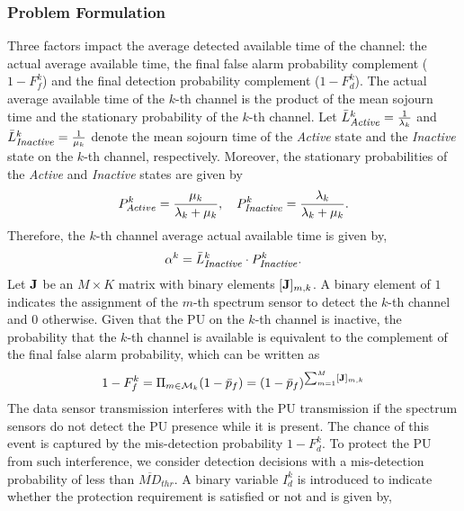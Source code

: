 \documentclass[journal]{IEEEtran} \ifCLASSINFOpdf
\begin{document}
\subsubsection{Problem Formulation}
Three factors impact the average detected available time of the channel: the actual average available time, the final false alarm probability complement ($1 - F_f^k$) and the final detection probability complement ($1 - F_d^k$). The actual average available time of the $k$-th channel is the product of the mean sojourn time and the stationary probability of the $k$-th channel. Let $\bar{L}_{\mbox{\textit{\footnotesize Active}}}^k= \frac{1}{\lambda_k}$ and $\bar{L}_{\mbox{\textit{\footnotesize Inactive}}}^k = \frac{1}{\mu_k}$ denote the mean sojourn time of the \textit{Active} state and the \textit{Inactive} state on the $k$-th channel, respectively. Moreover, the stationary probabilities of the \textit{Active} and \textit{Inactive} states are given by
\begin{equation}\label{eqn_Poo}
P_{Active}^k = \frac{\mu_k}{\lambda_k + \mu_k}, \quad P_{\mbox{\footnotesize \textit{Inactive}}}^k = \frac{\lambda_k}{\lambda_k + \mu_k}.
\end{equation}
Therefore, the $k$-th channel average actual available time is given by,
\begin{equation}
\alpha^k = \bar{L}_{\mbox{\textit{\footnotesize Inactive}}}^k \cdot P_{\mbox{\textit{\footnotesize Inactive}}}^k.
\end{equation}
Let $\bf{J}$ be an $M \times K$ matrix with binary elements $[{\bf J}]_{m,k}$. A binary element of $1$ indicates the assignment of the $m$-th spectrum sensor to detect the $k$-th channel and $0$ otherwise. Given that the PU on the $k$-th channel is inactive, the probability that the $k$-th channel is available is equivalent to the complement of the final false alarm probability, which can be written as
\begin{equation}
1-F_f^k = \Pi_{m \in \mathcal{M}_k} (1 - \bar{p}_f) = (1-\bar{p}_f)^{\sum_{m=1}^M [{\bf{J}}]_{m,k}}
\end{equation}
The data sensor transmission interferes with the PU transmission if the spectrum sensors do not detect the PU presence while it is present. The chance of this event is captured by the mis-detection probability $1 - F_d^k$. To protect the PU from such interference, we consider detection decisions with a mis-detection probability of less than $\overline{MD}_{thr}$. A binary variable $I^k_{d}$ is introduced to indicate whether the protection requirement is satisfied or not and is given by,
\end{document}
